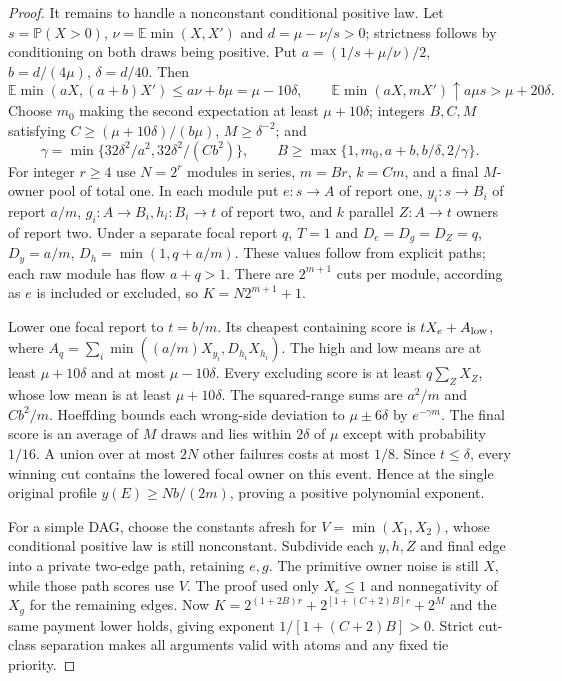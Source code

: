 \documentclass[11pt]{article}
\theoremstyle{definition}\newtheorem{definition}[theorem]{Definition}
\theoremstyle{remark}\newtheorem{remark}[theorem]{Remark}
\newcommand{\E}{\mathbb E}
\newcommand{\Prob}{\mathbb P}
\begin{document}
\begin{proof}
It remains to handle a nonconstant conditional positive law. Let
$s=\Prob(X>0)$, $\nu=\E\min(X,X')$ and $d=\mu-\nu/s>0$;
strictness follows by conditioning on both draws being positive. Put
$a=(1/s+\mu/\nu)/2$, $b=d/(4\mu)$, $\delta=d/40$.
Then
\[
 \E\min(aX,(a+b)X')\le a\nu+b\mu=\mu-10\delta,
 \qquad \E\min(aX,mX')\uparrow a\mu s>\mu+20\delta.
\]
Choose $m_0$ making the second expectation at least $\mu+10\delta$;
integers $B,C,M$ satisfying $C\ge(\mu+10\delta)/(b\mu)$, $M\ge\delta^{-2}$; and
\[
 \gamma=\min\{32\delta^2/a^2,32\delta^2/(Cb^2)\},\qquad
 B\ge\max\{1,m_0,a+b,b/\delta,2/\gamma\}.
\]
For integer $r\ge4$ use $N=2^r$ modules in series, $m=Br$,
$k=Cm$, and a final $M$-owner pool of total one. In each module put
$e:s\to A$ of report one, $y_i:s\to B_i$ of report $a/m$,
$g_i:A\to B_i,h_i:B_i\to t$ of report two, and $k$ parallel
$Z:A\to t$ owners of report two. Under a separate focal report $q$,
$T=1$ and
$D_e=D_g=D_Z=q$, $D_y=a/m$, $D_h=\min(1,q+a/m)$.
These values follow from explicit paths; each raw module has flow $a+q>1$.
There are $2^{m+1}$ cuts per module, according as $e$ is included or
excluded, so $K=N2^{m+1}+1$.

Lower one focal report to $t=b/m$. Its cheapest containing score is
$tX_e+A_{\rm low}$, where
$A_q=\sum_i\min((a/m)X_{y_i},D_{h_i}X_{h_i})$.
The high and low means are at least $\mu+10\delta$ and at most
$\mu-10\delta$. Every excluding score is at least $q\sum_ZX_Z$,
whose low mean is at least $\mu+10\delta$.
The squared-range sums are $a^2/m$ and $Cb^2/m$. Hoeffding bounds each
wrong-side deviation to $\mu\pm6\delta$ by $e^{-\gamma m}$.
The final score is an average of $M$ draws and lies within $2\delta$
of $\mu$ except with probability $1/16$. A union over at most $2N$
other failures costs at most $1/8$. Since $t\le\delta$, every winning
cut contains the lowered focal owner on this event. Hence at the single
original profile $y(E)\ge Nb/(2m)$, proving a positive polynomial exponent.

For a simple DAG, choose the constants afresh for $V=\min(X_1,X_2)$,
whose conditional positive law is still nonconstant. Subdivide each
$y,h,Z$ and final edge into a private two-edge path, retaining $e,g$.
The primitive owner noise is still $X$, while those path scores use $V$.
The proof used only $X_e\le1$ and nonnegativity of $X_g$ for the remaining
edges. Now
$K=2^{(1+2B)r}+2^{[1+(C+2)B]r}+2^M$ and the same payment lower holds,
giving exponent $1/[1+(C+2)B]>0$. Strict cut-class separation makes all
arguments valid with atoms and any fixed tie priority.
\end{proof}
\end{document}
